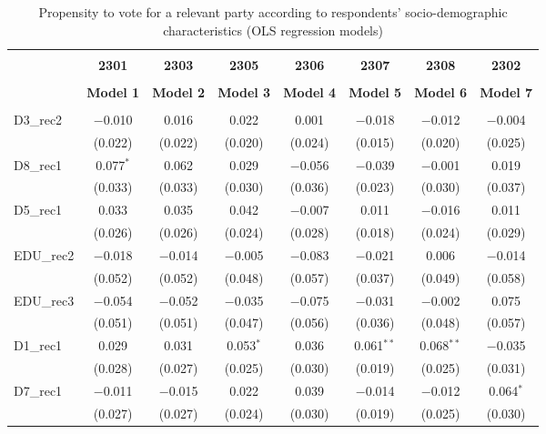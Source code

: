 \documentclass[
]{article}
\begin{document}
\begin{table}[!htbp] \centering 
  \caption{Propensity to vote for a relevant party according to respondents' 
                     socio-demographic characteristics (OLS regression models)} 
  \label{table:full_ols_ro} 
\begin{tabular}{@{\extracolsep{5pt}}lccccccc} 
\\[-1.8ex]\hline \\[-1.8ex] 
 & \textbf{2301} & \textbf{2303} & \textbf{2305} & \textbf{2306} & \textbf{2307} & \textbf{2308} & \textbf{2302} \\ 
\\[-1.8ex] & \textbf{Model 1} & \textbf{Model 2} & \textbf{Model 3} & \textbf{Model 4} & \textbf{Model 5} & \textbf{Model 6} & \textbf{Model 7}\\ 
\hline \\[-1.8ex] 
 D3\_rec2 & $-$0.010 & 0.016 & 0.022 & 0.001 & $-$0.018 & $-$0.012 & $-$0.004 \\ 
  & (0.022) & (0.022) & (0.020) & (0.024) & (0.015) & (0.020) & (0.025) \\ 
  D8\_rec1 & 0.077$^{*}$ & 0.062 & 0.029 & $-$0.056 & $-$0.039 & $-$0.001 & 0.019 \\ 
  & (0.033) & (0.033) & (0.030) & (0.036) & (0.023) & (0.030) & (0.037) \\ 
  D5\_rec1 & 0.033 & 0.035 & 0.042 & $-$0.007 & 0.011 & $-$0.016 & 0.011 \\ 
  & (0.026) & (0.026) & (0.024) & (0.028) & (0.018) & (0.024) & (0.029) \\ 
  EDU\_rec2 & $-$0.018 & $-$0.014 & $-$0.005 & $-$0.083 & $-$0.021 & 0.006 & $-$0.014 \\ 
  & (0.052) & (0.052) & (0.048) & (0.057) & (0.037) & (0.049) & (0.058) \\ 
  EDU\_rec3 & $-$0.054 & $-$0.052 & $-$0.035 & $-$0.075 & $-$0.031 & $-$0.002 & 0.075 \\ 
  & (0.051) & (0.051) & (0.047) & (0.056) & (0.036) & (0.048) & (0.057) \\ 
  D1\_rec1 & 0.029 & 0.031 & 0.053$^{*}$ & 0.036 & 0.061$^{**}$ & 0.068$^{**}$ & $-$0.035 \\ 
  & (0.028) & (0.027) & (0.025) & (0.030) & (0.019) & (0.025) & (0.031) \\ 
  D7\_rec1 & $-$0.011 & $-$0.015 & 0.022 & 0.039 & $-$0.014 & $-$0.012 & 0.064$^{*}$ \\ 
  & (0.027) & (0.027) & (0.024) & (0.030) & (0.019) & (0.025) & (0.030) \\ 

\end{tabular}
\end{table}
\end{document}
